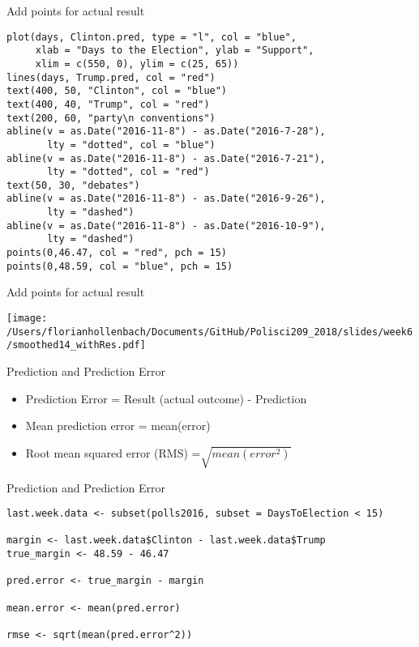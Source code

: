 \documentclass[presentation]{beamer}
\begin{document}
\begin{frame}[fragile,shrink=25,label={sec:orgd88cc56}]{Add points for actual result}
 \begin{verbatim}
plot(days, Clinton.pred, type = "l", col = "blue",
     xlab = "Days to the Election", ylab = "Support",
     xlim = c(550, 0), ylim = c(25, 65))
lines(days, Trump.pred, col = "red")
text(400, 50, "Clinton", col = "blue")
text(400, 40, "Trump", col = "red")
text(200, 60, "party\n conventions")
abline(v = as.Date("2016-11-8") - as.Date("2016-7-28"),
       lty = "dotted", col = "blue")
abline(v = as.Date("2016-11-8") - as.Date("2016-7-21"),
       lty = "dotted", col = "red")
text(50, 30, "debates")
abline(v = as.Date("2016-11-8") - as.Date("2016-9-26"),
       lty = "dashed")
abline(v = as.Date("2016-11-8") - as.Date("2016-10-9"),
       lty = "dashed")
points(0,46.47, col = "red", pch = 15)
points(0,48.59, col = "blue", pch = 15)
\end{verbatim}
\end{frame}



\begin{frame}[label={sec:org0792c8c}]{Add points for actual result}
\begin{center}
\texttt{[image: /Users/florianhollenbach/Documents/GitHub/Polisci209\_2018/slides/week6/smoothed14\_withRes.pdf]}
\end{center}
\end{frame}


\begin{frame}[label={sec:org8c68836}]{Prediction and Prediction Error}
\begin{itemize}
\item Prediction Error = Result (actual outcome) - Prediction
\item Mean prediction error = mean(error)
\item Root mean squared error (RMS) =\(\sqrt{mean(error^2)}\)
\end{itemize}
\end{frame}

\begin{frame}[fragile,shrink=25,label={sec:org6a4515a}]{Prediction and Prediction Error}
 \begin{verbatim}
last.week.data <- subset(polls2016, subset = DaysToElection < 15)

margin <- last.week.data$Clinton - last.week.data$Trump
true_margin <- 48.59 - 46.47

pred.error <- true_margin - margin

mean.error <- mean(pred.error)

rmse <- sqrt(mean(pred.error^2))
\end{verbatim}
\end{frame}
\end{document}
